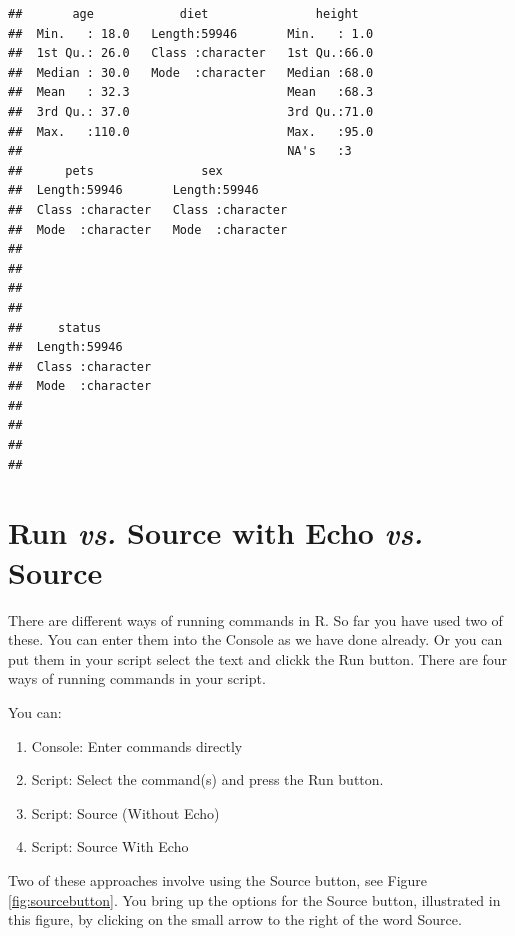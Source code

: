 \documentclass[
]{krantz}
\providecommand{\tightlist}{%
  \setlength{\itemsep}{0pt}\setlength{\parskip}{0pt}}
\begin{document}
\begin{verbatim}
##       age            diet               height    
##  Min.   : 18.0   Length:59946       Min.   : 1.0  
##  1st Qu.: 26.0   Class :character   1st Qu.:66.0  
##  Median : 30.0   Mode  :character   Median :68.0  
##  Mean   : 32.3                      Mean   :68.3  
##  3rd Qu.: 37.0                      3rd Qu.:71.0  
##  Max.   :110.0                      Max.   :95.0  
##                                     NA's   :3     
##      pets               sex           
##  Length:59946       Length:59946      
##  Class :character   Class :character  
##  Mode  :character   Mode  :character  
##                                       
##                                       
##                                       
##                                       
##     status         
##  Length:59946      
##  Class :character  
##  Mode  :character  
##                    
##                    
##                    
## 
\end{verbatim}

\hypertarget{run-vs.-source-with-echo-vs.-source}{%
\section{\texorpdfstring{Run \emph{vs.} Source with Echo \emph{vs.} Source}{Run vs. Source with Echo vs. Source}}\label{run-vs.-source-with-echo-vs.-source}}

There are different ways of running commands in R. So far you have used two of these. You can enter them into the Console as we have done already. Or you can put them in your script select the text and clickk the Run button. There are four ways of running commands in your script.

You can:

\begin{enumerate}
\def\labelenumi{\arabic{enumi}.}
\tightlist
\item
  Console: Enter commands directly
\item
  Script: Select the command(s) and press the Run button.
\item
  Script: Source (Without Echo)
\item
  Script: Source With Echo
\end{enumerate}

Two of these approaches involve using the Source button, see Figure \ref{fig:sourcebutton}. You bring up the options for the Source button, illustrated in this figure, by clicking on the small arrow to the right of the word Source.
\end{document}
